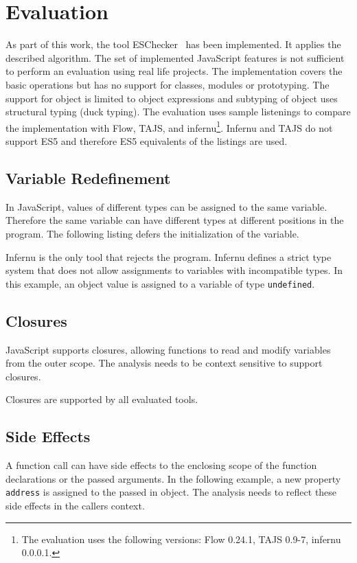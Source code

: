 \section{Evaluation}\label{sec:evaluation}
As part of this work, the tool ESChecker~\cite{Reiser2016} has been implemented. It applies the described algorithm. The set of implemented JavaScript features is not sufficient to perform an evaluation using real life projects. The implementation covers the basic operations but has no support for classes, modules or prototyping. The support for object is limited to object expressions and subtyping of object uses structural typing (duck typing). The evaluation uses sample listenings to compare the implementation with Flow, TAJS, and infernu\footnote{The evaluation uses the following versions: Flow 0.24.1, TAJS 0.9-7, infernu 0.0.0.1.}. Infernu and TAJS do not support ES5 and therefore ES5 equivalents of the listings are used.

\subsection{Variable Redefinement}
In JavaScript, values of different types can be assigned to the same variable. Therefore the same variable can have different types at different positions in the program. The following listing defers the initialization of the variable.


Infernu is the only tool that rejects the program. Infernu defines a strict type system that does not allow assignments to variables with incompatible types. In this example, an object value is assigned to a variable of type \texttt{undefined}. 

\subsection{Closures}
JavaScript supports closures, allowing functions to read and modify variables from the outer scope. The analysis needs to be context sensitive to support closures. 


Closures are supported by all evaluated tools.

\subsection{Side Effects}
A function call can have side effects to the enclosing scope of the function declarations or the passed arguments. In the following example, a new property \texttt{address} is assigned to the passed in object. The analysis needs to reflect these side effects in the callers context.

